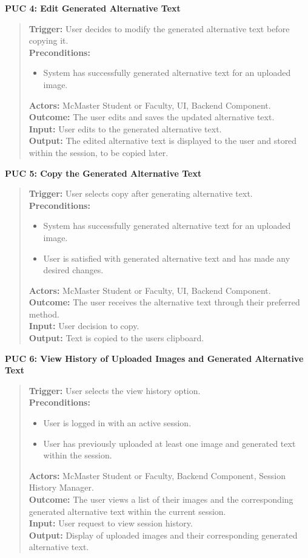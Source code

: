 \documentclass[12pt]{article}
\begin{document}
\textbf{PUC 4: Edit Generated Alternative Text}
\begin{quote}
\textbf{Trigger:} User decides to modify the generated alternative text before copying it.\\
\textbf{Preconditions:}
\begin{itemize}
  \item System has successfully generated alternative text for an uploaded image.
\end{itemize}
\textbf{Actors:} McMaster Student or Faculty, UI, Backend Component.\\
\textbf{Outcome:} The user edits and saves the updated alternative text. \\
\textbf{Input:} User edits to the generated alternative text.\\
\textbf{Output:} The edited alternative text is displayed to the user and stored within the session, to be copied later.
\end{quote}
\textbf{PUC 5: Copy the Generated Alternative Text }
\begin{quote}
\textbf{Trigger:} User selects copy after generating alternative text.\\
\textbf{Preconditions:}
\begin{itemize}
  \item System has successfully generated alternative text for an uploaded image.
  \item User is satisfied with generated alternative text and has made any desired changes. 
\end{itemize}
\textbf{Actors:} McMaster Student or Faculty, UI, Backend Component.\\
\textbf{Outcome:} The user receives the alternative text through their preferred method. \\
\textbf{Input:} User decision to copy.\\
\textbf{Output:} Text is copied to the users clipboard.
\end{quote}
\textbf{PUC 6: View History of Uploaded Images and Generated Alternative Text}
\begin{quote}
  \textbf{Trigger:} User selects the view history option.\\
  \textbf{Preconditions:}
  \begin{itemize}
    \item User is logged in with an active session.
    \item User has previously uploaded at least one image and
      generated text within the session.
  \end{itemize}
  \textbf{Actors:} McMaster Student or Faculty, Backend Component, Session History Manager.\\
  \textbf{Outcome:} The user views a list of their images and the
  corresponding generated alternative text within the current session. \\
  \textbf{Input:} User request to view session history.\\
  \textbf{Output:} Display of uploaded images and their corresponding
  generated alternative text.\\
\end{quote}
\end{document}
